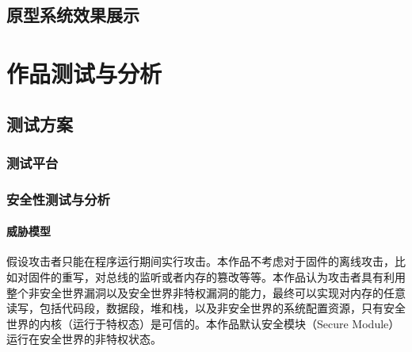 \documentclass[12pt,a4paper]{ctexart}
\numberwithin{figure}{section}
\begin{document}
\subsection{原型系统效果展示}

\section{作品测试与分析}
\subsection{测试方案}
\subsubsection{测试平台}

\subsubsection{安全性测试与分析}
\paragraph{威胁模型}
\par 假设攻击者只能在程序运行期间实行攻击。本作品不考虑对于固件的离线攻击，比如对固件的重写，对总线的监听或者内存的篡改等等。本作品认为攻击者具有利用整个非安全世界漏洞以及安全世界非特权漏洞的能力，最终可以实现对内存的任意读写，包括代码段，数据段，堆和栈，以及非安全世界的系统配置资源，只有安全世界的内核（运行于特权态）是可信的。本作品默认安全模块（Secure Module）运行在安全世界的非特权状态。
\end{document}
